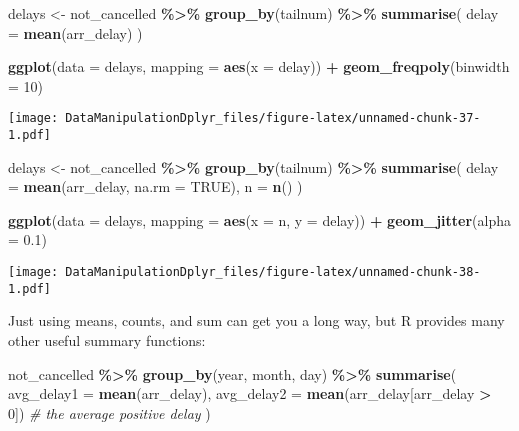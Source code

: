 \documentclass[
]{article}
\newenvironment{Shaded}{\begin{snugshade}}{\end{snugshade}}
\newcommand{\AttributeTok}[1]{\textcolor[rgb]{0.13,0.29,0.53}{#1}}
\newcommand{\CommentTok}[1]{\textcolor[rgb]{0.56,0.35,0.01}{\textit{#1}}}
\newcommand{\ConstantTok}[1]{\textcolor[rgb]{0.56,0.35,0.01}{#1}}
\newcommand{\DecValTok}[1]{\textcolor[rgb]{0.00,0.00,0.81}{#1}}
\newcommand{\FloatTok}[1]{\textcolor[rgb]{0.00,0.00,0.81}{#1}}
\newcommand{\FunctionTok}[1]{\textcolor[rgb]{0.13,0.29,0.53}{\textbf{#1}}}
\newcommand{\NormalTok}[1]{#1}
\newcommand{\OtherTok}[1]{\textcolor[rgb]{0.56,0.35,0.01}{#1}}
\newcommand{\SpecialCharTok}[1]{\textcolor[rgb]{0.81,0.36,0.00}{\textbf{#1}}}
\begin{document}
\begin{Shaded}
\begin{Highlighting}[]
\NormalTok{delays }\OtherTok{\textless{}{-}}\NormalTok{ not\_cancelled }\SpecialCharTok{\%\textgreater{}\%} 
  \FunctionTok{group\_by}\NormalTok{(tailnum) }\SpecialCharTok{\%\textgreater{}\%} 
  \FunctionTok{summarise}\NormalTok{(}
    \AttributeTok{delay =} \FunctionTok{mean}\NormalTok{(arr\_delay)}
\NormalTok{  )}

\FunctionTok{ggplot}\NormalTok{(}\AttributeTok{data =}\NormalTok{ delays, }\AttributeTok{mapping =} \FunctionTok{aes}\NormalTok{(}\AttributeTok{x =}\NormalTok{ delay)) }\SpecialCharTok{+} 
  \FunctionTok{geom\_freqpoly}\NormalTok{(}\AttributeTok{binwidth =} \DecValTok{10}\NormalTok{)}
\end{Highlighting}
\end{Shaded}

\texttt{[image: DataManipulationDplyr\_files/figure-latex/unnamed-chunk-37-1.pdf]}

\begin{Shaded}
\begin{Highlighting}[]
\NormalTok{delays }\OtherTok{\textless{}{-}}\NormalTok{ not\_cancelled }\SpecialCharTok{\%\textgreater{}\%} 
  \FunctionTok{group\_by}\NormalTok{(tailnum) }\SpecialCharTok{\%\textgreater{}\%} 
  \FunctionTok{summarise}\NormalTok{(}
    \AttributeTok{delay =} \FunctionTok{mean}\NormalTok{(arr\_delay, }\AttributeTok{na.rm =} \ConstantTok{TRUE}\NormalTok{),}
    \AttributeTok{n =} \FunctionTok{n}\NormalTok{()}
\NormalTok{  )}

\FunctionTok{ggplot}\NormalTok{(}\AttributeTok{data =}\NormalTok{ delays, }\AttributeTok{mapping =} \FunctionTok{aes}\NormalTok{(}\AttributeTok{x =}\NormalTok{ n, }\AttributeTok{y =}\NormalTok{ delay)) }\SpecialCharTok{+} 
  \FunctionTok{geom\_jitter}\NormalTok{(}\AttributeTok{alpha =} \FloatTok{0.1}\NormalTok{)}
\end{Highlighting}
\end{Shaded}

\texttt{[image: DataManipulationDplyr\_files/figure-latex/unnamed-chunk-38-1.pdf]}

Just using means, counts, and sum can get you a long way, but R provides
many other useful summary functions:

\begin{Shaded}
\begin{Highlighting}[]
\NormalTok{not\_cancelled }\SpecialCharTok{\%\textgreater{}\%} 
  \FunctionTok{group\_by}\NormalTok{(year, month, day) }\SpecialCharTok{\%\textgreater{}\%} 
  \FunctionTok{summarise}\NormalTok{(}
    \AttributeTok{avg\_delay1 =} \FunctionTok{mean}\NormalTok{(arr\_delay),}
    \AttributeTok{avg\_delay2 =} \FunctionTok{mean}\NormalTok{(arr\_delay[arr\_delay }\SpecialCharTok{\textgreater{}} \DecValTok{0}\NormalTok{]) }\CommentTok{\# the average positive delay}
\NormalTok{  )}
\end{Highlighting}
\end{Shaded}
\end{document}
